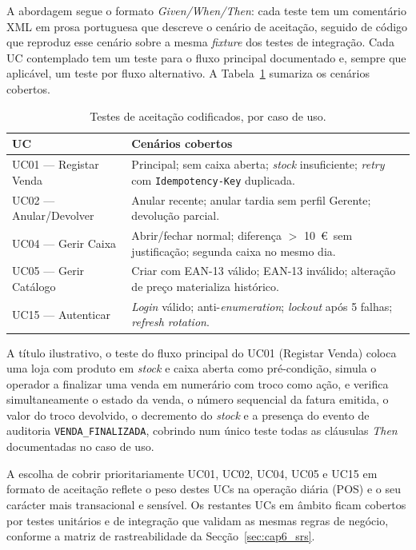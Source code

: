     A abordagem segue o formato \textit{Given/When/Then}: cada teste tem um comentário XML em prosa portuguesa que descreve o cenário de aceitação, seguido de código que reproduz esse cenário sobre a mesma \textit{fixture} dos testes de integração. Cada UC contemplado tem um teste para o fluxo principal documentado e, sempre que aplicável, um teste por fluxo alternativo. A Tabela~\ref{tab:aceitacao_por_uc} sumariza os cenários cobertos.

    \begin{table}[H]
    \centering
    \small
    \begin{tabular}{|p{3.5cm}|p{9cm}|}
    \hline
    \textbf{UC} & \textbf{Cenários cobertos} \\
    \hline
    UC01 --- Registar Venda & Principal; sem caixa aberta; \textit{stock} insuficiente; \textit{retry} com \texttt{Idempotency-Key} duplicada. \\
    \hline
    UC02 --- Anular/Devolver & Anular recente; anular tardia sem perfil Gerente; devolução parcial. \\
    \hline
    UC04 --- Gerir Caixa & Abrir/fechar normal; diferença $>$ 10~\euro\ sem justificação; segunda caixa no mesmo dia. \\
    \hline
    UC05 --- Gerir Catálogo & Criar com EAN-13 válido; EAN-13 inválido; alteração de preço materializa histórico. \\
    \hline
    UC15 --- Autenticar & \textit{Login} válido; anti-\textit{enumeration}; \textit{lockout} após 5 falhas; \textit{refresh rotation}. \\
    \hline
    \end{tabular}
    \caption{Testes de aceitação codificados, por caso de uso.}
    \label{tab:aceitacao_por_uc}
    \end{table}

    A título ilustrativo, o teste do fluxo principal do UC01 (Registar Venda) coloca uma loja com produto em \textit{stock} e caixa aberta como pré-condição, simula o operador a finalizar uma venda em numerário com troco como ação, e verifica simultaneamente o estado da venda, o número sequencial da fatura emitida, o valor do troco devolvido, o decremento do \textit{stock} e a presença do evento de auditoria \texttt{VENDA\_FINALIZADA}, cobrindo num único teste todas as cláusulas \textit{Then} documentadas no caso de uso.

    A escolha de cobrir prioritariamente UC01, UC02, UC04, UC05 e UC15 em formato de aceitação reflete o peso destes UCs na operação diária (POS) e o seu carácter mais transacional e sensível. Os restantes UCs em âmbito ficam cobertos por testes unitários e de integração que validam as mesmas regras de negócio, conforme a matriz de rastreabilidade da Secção~\ref{sec:cap6_srs}.

